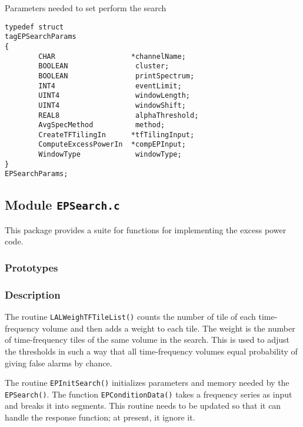 \noindent Parameters needed to set perform the search

\begin{verbatim}
typedef struct
tagEPSearchParams
{
        CHAR                  *channelName;
        BOOLEAN                cluster;
        BOOLEAN                printSpectrum;
        INT4                   eventLimit;
        UINT4                  windowLength;
        UINT4                  windowShift;
        REAL8                  alphaThreshold;
        AvgSpecMethod          method;
        CreateTFTilingIn      *tfTilingInput;
        ComputeExcessPowerIn  *compEPInput;
        WindowType             windowType;
}
EPSearchParams;
\end{verbatim}


\newpage
\subsection{Module \texttt{EPSearch.c}}
\label{ss:EPSearch.c}

This package provides a suite for functions for implementing the
excess power code. 

\subsubsection*{Prototypes}
\vspace{0.1in}




\subsubsection*{Description}

The routine \verb+LALWeighTFTileList()+ counts the number of tile of
each time-frequency volume and then adds a weight to each tile.  The
weight is the number of time-frequency tiles of the same volume in the
search.  This is used to adjust the thresholds in such a way that all
time-frequency volumes equal probability of giving false alarms by
chance.  

The routine \verb+EPInitSearch()+ initializes parameters and memory
needed by the \verb+EPSearch()+.     The function
\verb+EPConditionData()+ takes a frequency series as input and breaks
it into segments.   This routine needs to be updated so that it can
handle the response function;  at present, it ignore it.

